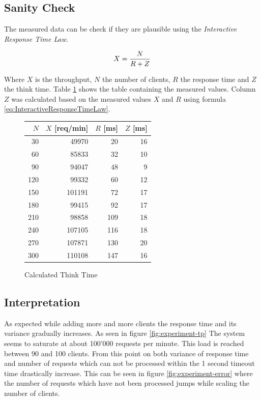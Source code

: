 \documentclass[a4paper]{article}
\begin{document}

\subsection{Sanity Check}

The measured data can be check if they are plausible using the \textit{Interactive Response Time Law}.

\begin{equation}
\label{eq:InteractiveResponseTimeLaw}
X = {{N} \over {R + Z}}
\end{equation}


Where $X$ is the throughput, $N$ the number of clients, $R$ the response time and $Z$ the think 	time. Table \ref{tabular:experimentsanitycheck} shows the table containing the measured values. Column $Z$ was calculated based on the measured values $X$ and $R$ using formula \ref{eq:InteractiveResponseTimeLaw}. 

\begin{figure}[H]
\label{tabular:experimentsanitycheck}
\begin{center}
\begin{tabular}{|r|r|r|r|}
\hline 
$N$ & $X$ [req/min] & $R$ [ms] & $Z$ [ms]\\
\hline 
30&	49970&	20&	16\\
60&	85833&	32&	10\\
90&	94047&	48&	9\\
120&	99332&	60&	12\\
150&	101191&	72&	17\\
180&	99415&	92&	17\\
210&	98858&	109&	18\\
240&	107105&	116&	18\\
270&	107871&	130&	20\\
300&	110108&	147&	16\\
\hline 
\end{tabular} 
\caption{Calculated Think Time}
\end{center}
\end{figure}


\subsection{Interpretation}

As expected while adding more and more clients the response time and its variance gradually increases. As seen in figure \ref{fig:experiment-tp} The system seems to saturate at about 100'000 requests per minute. This load is reached between 90 and 100 clients. From this point on both variance of response time and number of requests which can not be processed within the 1 second timeout time drastically increase. This can be seen in figure \ref{fig:experiment-error} where the number of requests which have not been processed jumps while scaling the number of clients.
\end{document}
